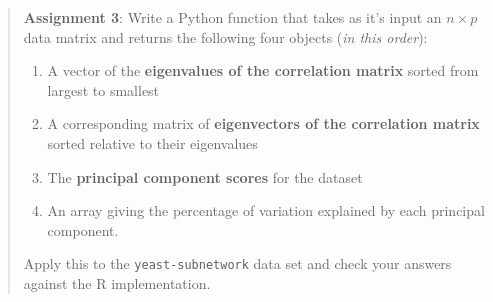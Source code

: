 \documentclass{article}
\begin{document}
\begin{quote}
\textbf{Assignment 3}: Write a Python function that takes as it's input
an $n \times p$ data matrix and returns the following four objects
(\emph{in this order}):

\begin{enumerate}[1.]
\item
  A vector of the \textbf{eigenvalues of the correlation matrix} sorted
  from largest to smallest
\item
  A corresponding matrix of \textbf{eigenvectors of the correlation
  matrix} sorted relative to their eigenvalues
\item
  The \textbf{principal component scores} for the dataset
\item
  An array giving the percentage of variation explained by each
  principal component.
\end{enumerate}
Apply this to the \lstinline!yeast-subnetwork! data set and check your
answers against the R implementation.

\end{quote}
\end{document}
